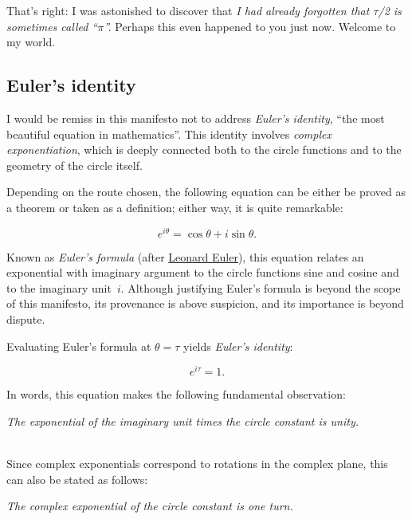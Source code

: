 \documentclass{article}
\begin{document}
\noindent That's right: I was astonished to discover that \emph{I had already forgotten that $\tau$/2 is sometimes called ``$\pi$''.} Perhaps this even happened to you just now. Welcome to my world.



   \subsection{Euler's identity} %
   \label{sec:euler_s_formula}

I would be remiss in this manifesto not to address \emph{Euler's identity}, ``the most beautiful equation in mathematics''. This identity involves \emph{complex exponentiation}, which is deeply connected both to the circle functions and to the geometry of the circle itself.

Depending on the route chosen, the following equation can be either be proved as a theorem or taken as a definition; either way, it is quite remarkable:

\[ e^{i\theta} = \cos\theta + i\sin\theta. \]

\noindent Known as \emph{Euler's formula} (after \href{http://en.wikipedia.org/wiki/Leonhard_Euler}{Leonard Euler}), this equation relates an exponential with imaginary argument to the circle functions sine and cosine and to the imaginary unit~$i$. Although justifying Euler's formula is beyond the scope of this manifesto, its provenance is above suspicion, and its importance is beyond dispute.

Evaluating Euler's formula at $\theta = \tau$ yields \emph{Euler's identity}:

\[ e^{i\tau} = 1. \]

\noindent In words, this equation makes the following fundamental observation: 

\begin{center}
\emph{The exponential of the imaginary unit times the circle constant is unity.}
\end{center}

\\

\noindent Since complex exponentials correspond to rotations in the complex plane, this can also be stated as follows:

\begin{center}
\emph{The complex exponential of the circle constant is one turn.}
\end{center}
\end{document}
